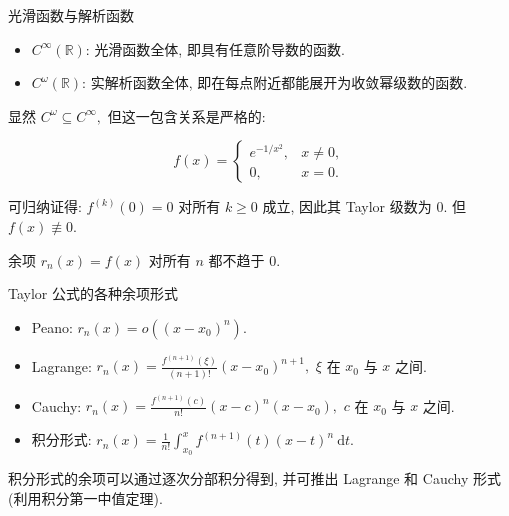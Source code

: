 \begin{frame}{光滑函数与解析函数}

\begin{Def}
\begin{itemize}
\item $C^\infty(\mathbb{R})$: {\color{red}光滑函数}全体, 即具有任意阶导数的函数.
\item $C^\omega(\mathbb{R})$: {\color{red}实解析函数}全体, 即在每点附近都能展开为收敛幂级数的函数.
\end{itemize}
\end{Def}

\pause

显然 $C^\omega \subseteq C^\infty,$ 但这一包含关系是{\color{red}严格的}:

\pause

\begin{eg}[光滑但非解析的典型例子]
\[f(x) = \begin{cases} e^{-1/x^2}, & x \neq 0, \\ 0, & x = 0. \end{cases}\]
\end{eg}

\pause

可归纳证得: $f^{(k)}(0) = 0$ 对所有 $k \geqslant 0$ 成立, 因此其 Taylor 级数为 $0.$ 但 $f(x) \not\equiv 0.$

余项 $r_n(x) = f(x)$ 对所有 $n$ 都不趋于 $0.$



\end{frame}


\begin{frame}{Taylor 公式的各种余项形式}

\begin{recall}[余项公式总结]
\begin{itemize}
\item Peano: $r_n(x) = o((x-x_0)^n).$
\pause
\item Lagrange: $r_n(x) = \frac{f^{(n+1)}(\xi)}{(n+1)!} (x-x_0)^{n+1},$ $\xi$ 在 $x_0$ 与 $x$ 之间.
\pause
\item Cauchy: $r_n(x) = \frac{f^{(n+1)}(c)}{n!} (x-c)^n (x-x_0),$ $c$ 在 $x_0$ 与 $x$ 之间.
\pause
\item {\color{red}积分形式}: $r_n(x) = \frac{1}{n!} \int_{x_0}^x f^{(n+1)}(t) (x-t)^n ~ \mathrm{d}t.$
\end{itemize}
\end{recall}

\pause

积分形式的余项可以通过逐次分部积分得到, 并可推出 Lagrange 和 Cauchy 形式 (利用积分第一中值定理).

\end{frame}

